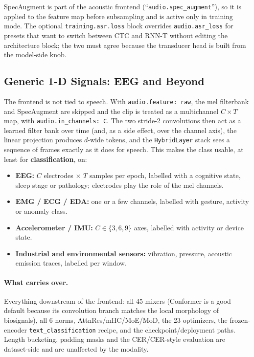 SpecAugment is part of the acoustic frontend (``\texttt{audio.spec\_augment}''), so it is applied to the feature map before subsampling and is active only in training mode. The optional \texttt{training.asr.loss} block overrides \texttt{audio.asr\_loss} for presets that want to switch between CTC and RNN-T without editing the architecture block; the two must agree because the transducer head is built from the model-side knob.

\subsection{Generic 1-D Signals: EEG and Beyond}
\label{sec:annex-18-eeg}

The frontend is not tied to speech. With \texttt{audio.feature: raw}, the mel filterbank and SpecAugment are skipped and the clip is treated as a multichannel $C \times T$ map, with \texttt{audio.in\_channels: C}. The two stride-2 convolutions then act as a learned filter bank over time (and, as a side effect, over the channel axis), the linear projection produces $d$-wide tokens, and the \texttt{HybridLayer} stack sees a sequence of frames exactly as it does for speech. This makes the class usable, at least for \textbf{classification}, on:

\begin{itemize}[leftmargin=*]
    \item \textbf{EEG:} $C$ electrodes $\times$ $T$ samples per epoch, labelled with a cognitive state, sleep stage or pathology; electrodes play the role of the mel channels.
    \item \textbf{EMG / ECG / EDA:} one or a few channels, labelled with gesture, activity or anomaly class.
    \item \textbf{Accelerometer / IMU:} $C \in \{3, 6, 9\}$ axes, labelled with activity or device state.
    \item \textbf{Industrial and environmental sensors:} vibration, pressure, acoustic emission traces, labelled per window.
\end{itemize}

\paragraph{What carries over.} Everything downstream of the frontend: all 45 mixers (Conformer is a good default because its convolution branch matches the local morphology of biosignals), all 6 norms, AttnRes/mHC/MoE/MoD, the 23 optimizers, the frozen-encoder \texttt{text\_classification} recipe, and the checkpoint/deployment paths. Length bucketing, padding masks and the CER/CER-style evaluation are dataset-side and are unaffected by the modality.

